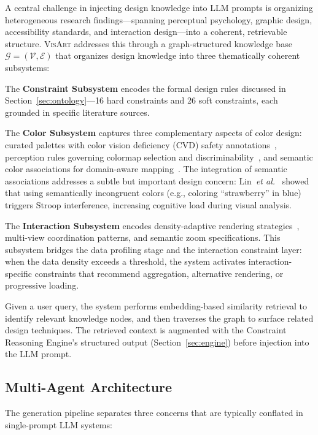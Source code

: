 \documentclass[final,5p,times,twocolumn]{elsarticle}
\newcommand{\sysname}{\textsc{VisArt}}
\newcommand{\eg}{e.g.}
\newcommand{\etal}{\textit{et al.}}
\begin{document}
A central challenge in injecting design knowledge into LLM prompts is organizing heterogeneous research findings---spanning perceptual psychology, graphic design, accessibility standards, and interaction design---into a coherent, retrievable structure. \sysname{} addresses this through a graph-structured knowledge base $\mathcal{G} = (\mathcal{V}, \mathcal{E})$ that organizes design knowledge into three thematically coherent subsystems:

The \textbf{Constraint Subsystem} encodes the formal design rules discussed in Section~\ref{sec:ontology}---16 hard constraints and 26 soft constraints, each grounded in specific literature sources.

The \textbf{Color Subsystem} captures three complementary aspects of color design: curated palettes with color vision deficiency (CVD) safety annotations~\cite{okabe2008color}, perception rules governing colormap selection and discriminability~\cite{ware2004information,borland2007rainbow}, and semantic color associations for domain-aware mapping~\cite{lin2013selecting}. The integration of semantic associations addresses a subtle but important design concern: Lin~\etal{}~\cite{lin2013selecting} showed that using semantically incongruent colors (\eg{}, coloring ``strawberry'' in blue) triggers Stroop interference, increasing cognitive load during visual analysis.

The \textbf{Interaction Subsystem} encodes density-adaptive rendering strategies~\cite{shneiderman1996eyes}, multi-view coordination patterns, and semantic zoom specifications. This subsystem bridges the data profiling stage and the interaction constraint layer: when the data density exceeds a threshold, the system activates interaction-specific constraints that recommend aggregation, alternative rendering, or progressive loading.

Given a user query, the system performs embedding-based similarity retrieval to identify relevant knowledge nodes, and then traverses the graph to surface related design techniques. The retrieved context is augmented with the Constraint Reasoning Engine's structured output (Section~\ref{sec:engine}) before injection into the LLM prompt.

\subsection{Multi-Agent Architecture}

The generation pipeline separates three concerns that are typically conflated in single-prompt LLM systems:
\end{document}
